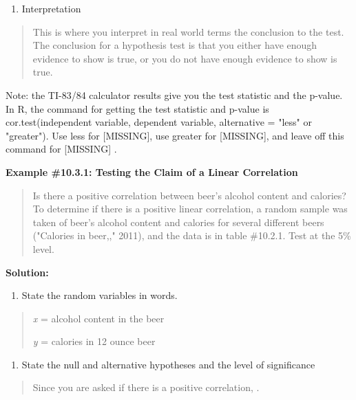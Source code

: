 \documentclass[]{book}
\providecommand{\tightlist}{%
  \setlength{\itemsep}{0pt}\setlength{\parskip}{0pt}}
\begin{document}
\begin{enumerate}
\def\labelenumi{\arabic{enumi}.}
\setcounter{enumi}{5}
\tightlist
\item
  Interpretation
\end{enumerate}

\begin{quote}
This is where you interpret in real world terms the conclusion to the test. The conclusion for a hypothesis test is that you either have enough evidence to show is true, or you do not have enough evidence to show is true.
\end{quote}

Note: the TI-83/84 calculator results give you the test statistic and the p-value. In R, the command for getting the test statistic and p-value is cor.test(independent variable, dependent variable, alternative = "less" or "greater"). Use less for {[}MISSING{]}, use greater for {[}MISSING{]}, and leave off this command for {[}MISSING{]} .

\textbf{Example \#10.3.1: Testing the Claim of a Linear Correlation}

\begin{quote}
Is there a positive correlation between beer's alcohol content and calories? To determine if there is a positive linear correlation, a random sample was taken of beer's alcohol content and calories for several different beers ("Calories in beer,," 2011), and the data is in table \#10.2.1. Test at the 5\% level.
\end{quote}

\textbf{Solution:}

\begin{enumerate}
\def\labelenumi{\arabic{enumi}.}
\tightlist
\item
  State the random variables in words.
\end{enumerate}

\begin{quote}
\emph{x} = alcohol content in the beer

\emph{y} = calories in 12 ounce beer
\end{quote}

\begin{enumerate}
\def\labelenumi{\arabic{enumi}.}
\setcounter{enumi}{1}
\tightlist
\item
  State the null and alternative hypotheses and the level of significance
\end{enumerate}

\begin{quote}
Since you are asked if there is a positive correlation, .
\end{quote}
\end{document}
